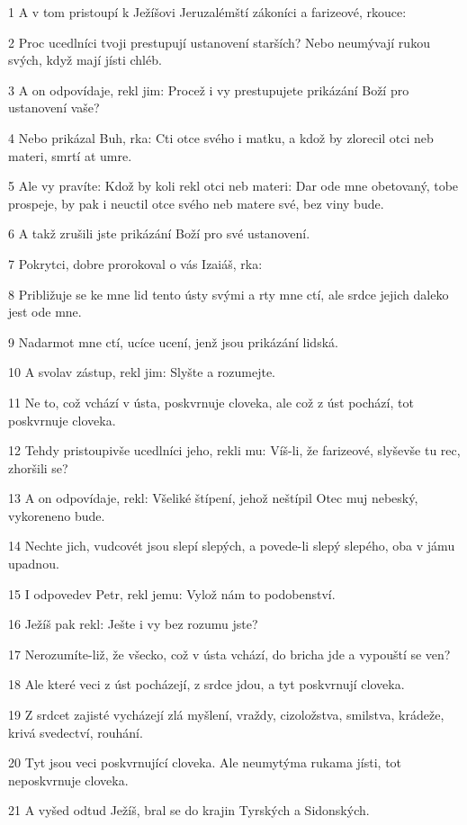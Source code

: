\par 1 A v tom pristoupí k Ježíšovi Jeruzalémští zákoníci a farizeové, rkouce:
\par 2 Proc ucedlníci tvoji prestupují ustanovení starších? Nebo neumývají rukou svých, když mají jísti chléb.
\par 3 A on odpovídaje, rekl jim: Procež i vy prestupujete prikázání Boží pro ustanovení vaše?
\par 4 Nebo prikázal Buh, rka: Cti otce svého i matku, a kdož by zlorecil otci neb materi, smrtí at umre.
\par 5 Ale vy pravíte: Kdož by koli rekl otci neb materi: Dar ode mne obetovaný, tobe prospeje, by pak i neuctil otce svého neb matere své, bez viny bude.
\par 6 A takž zrušili jste prikázání Boží pro své ustanovení.
\par 7 Pokrytci, dobre prorokoval o vás Izaiáš, rka:
\par 8 Približuje se ke mne lid tento ústy svými a rty mne ctí, ale srdce jejich daleko jest ode mne.
\par 9 Nadarmot mne ctí, ucíce ucení, jenž jsou prikázání lidská.
\par 10 A svolav zástup, rekl jim: Slyšte a rozumejte.
\par 11 Ne to, což vchází v ústa, poskvrnuje cloveka, ale což z úst pochází, tot poskvrnuje cloveka.
\par 12 Tehdy pristoupivše ucedlníci jeho, rekli mu: Víš-li, že farizeové, slyševše tu rec, zhoršili se?
\par 13 A on odpovídaje, rekl: Všeliké štípení, jehož neštípil Otec muj nebeský, vykoreneno bude.
\par 14 Nechte jich, vudcovét jsou slepí slepých, a povede-li slepý slepého, oba v jámu upadnou.
\par 15 I odpovedev Petr, rekl jemu: Vylož nám to podobenství.
\par 16 Ježíš pak rekl: Ješte i vy bez rozumu jste?
\par 17 Nerozumíte-liž, že všecko, což v ústa vchází, do bricha jde a vypouští se ven?
\par 18 Ale které veci z úst pocházejí, z srdce jdou, a tyt poskvrnují cloveka.
\par 19 Z srdcet zajisté vycházejí zlá myšlení, vraždy, cizoložstva, smilstva, krádeže, krivá svedectví, rouhání.
\par 20 Tyt jsou veci poskvrnující cloveka. Ale neumytýma rukama jísti, tot neposkvrnuje cloveka.
\par 21 A vyšed odtud Ježíš, bral se do krajin Tyrských a Sidonských.
